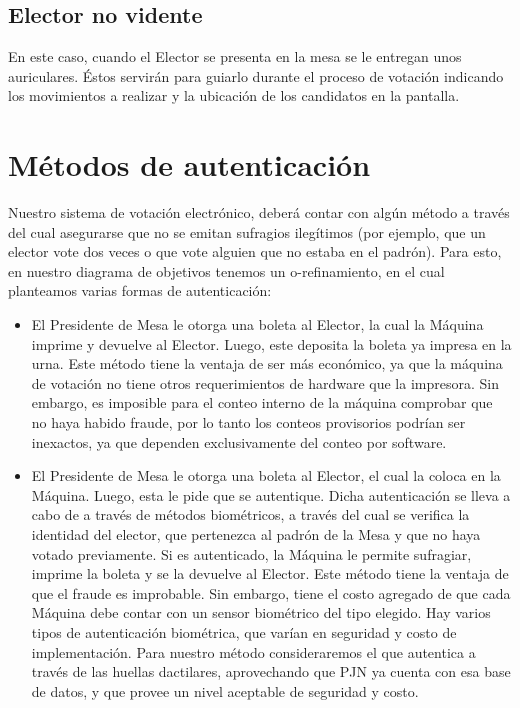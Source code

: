 \documentclass[spanish, 10pt,a4paper]{article}
\numberwithin{equation}{section} %
\begin{document}
\subsection{Elector no vidente}

	En este caso, cuando el Elector se presenta en la mesa se le entregan unos auriculares. Éstos servirán para guiarlo durante el proceso de votación indicando los movimientos a realizar y la ubicación de los candidatos en la pantalla.

\section{Métodos de autenticación}

	Nuestro sistema de votación electrónico, deberá contar con algún método a través del cual asegurarse que no se emitan sufragios ilegítimos (por ejemplo, que un elector vote dos veces o que vote alguien que no estaba en el padrón). Para esto, en nuestro diagrama de objetivos tenemos un o-refinamiento, en el cual planteamos varias formas de autenticación: 

	\begin{itemize}

		\item El Presidente de Mesa le otorga una boleta al Elector, la cual la Máquina imprime y devuelve al Elector. Luego, este deposita la boleta ya impresa en la urna. Este método tiene la ventaja de ser más económico, ya que la máquina de votación no tiene otros requerimientos de hardware que la impresora. Sin embargo, es imposible para el conteo interno de la máquina comprobar que no haya habido fraude, por lo tanto los conteos provisorios podrían ser inexactos, ya que dependen exclusivamente del conteo por software.
		\item El Presidente de Mesa le otorga una boleta al Elector, el cual la coloca en la Máquina. Luego, esta le pide que se autentique. Dicha autenticación se lleva a cabo de a través de métodos biométricos, a través del cual se verifica la identidad del elector, que pertenezca al padrón de la Mesa y que no haya votado previamente. Si es autenticado, la Máquina le permite sufragiar, imprime la boleta y se la devuelve al Elector. Este método tiene la ventaja de que el fraude es improbable. Sin embargo, tiene el costo agregado de que cada Máquina debe contar con un sensor biométrico del tipo elegido. Hay varios tipos de autenticación biométrica, que varían en seguridad y costo de implementación. Para nuestro método consideraremos el que autentica a través de las huellas dactilares, aprovechando que PJN ya cuenta con esa base de datos, y que provee un nivel aceptable de seguridad y costo.
	\end{itemize}
\end{document}
